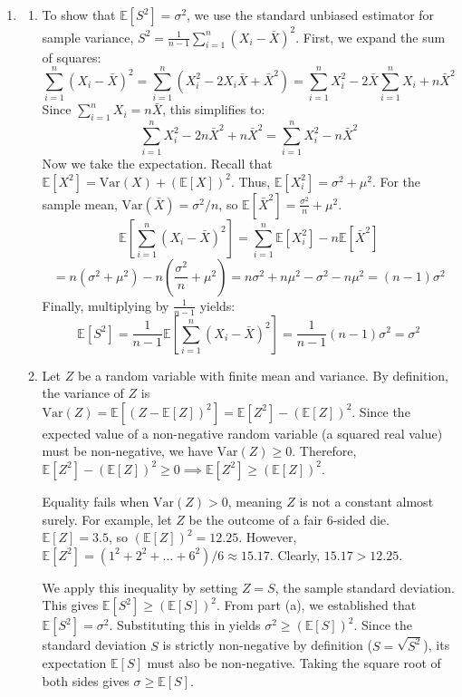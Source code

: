\documentclass[12pt,a4paper]{article}\usepackage[]{graphicx}\usepackage[]{xcolor}
\begin{document}
\begin{enumerate}[label=\arabic*.]
    \item 
    \begin{enumerate}[label=(\alph*)]
        \item To show that $\mathbb{E}[S^2] = \sigma^2$, we use the standard unbiased estimator for sample variance, $S^2 = \frac{1}{n-1}\sum_{i=1}^n(X_i-\bar{X})^2$.
        First, we expand the sum of squares:
        $$ \sum_{i=1}^n (X_i - \bar{X})^2 = \sum_{i=1}^n (X_i^2 - 2X_i\bar{X} + \bar{X}^2) = \sum_{i=1}^n X_i^2 - 2\bar{X}\sum_{i=1}^n X_i + n\bar{X}^2 $$
        Since $\sum_{i=1}^n X_i = n\bar{X}$, this simplifies to:
        $$ \sum_{i=1}^n X_i^2 - 2n\bar{X}^2 + n\bar{X}^2 = \sum_{i=1}^n X_i^2 - n\bar{X}^2 $$
        Now we take the expectation. Recall that $\mathbb{E}[X^2] = \text{Var}(X) + (\mathbb{E}[X])^2$. Thus, $\mathbb{E}[X_i^2] = \sigma^2 + \mu^2$. 
        For the sample mean, $\text{Var}(\bar{X}) = \sigma^2/n$, so $\mathbb{E}[\bar{X}^2] = \frac{\sigma^2}{n} + \mu^2$.
        $$ \mathbb{E}\left[\sum_{i=1}^n (X_i - \bar{X})^2\right] = \sum_{i=1}^n \mathbb{E}[X_i^2] - n\mathbb{E}[\bar{X}^2] $$
        $$ = n(\sigma^2 + \mu^2) - n\left(\frac{\sigma^2}{n} + \mu^2\right) = n\sigma^2 + n\mu^2 - \sigma^2 - n\mu^2 = (n-1)\sigma^2 $$
        Finally, multiplying by $\frac{1}{n-1}$ yields:
        $$ \mathbb{E}[S^2] = \frac{1}{n-1} \mathbb{E}\left[\sum_{i=1}^n (X_i - \bar{X})^2\right] = \frac{1}{n-1}(n-1)\sigma^2 = \sigma^2 $$

        \item Let $Z$ be a random variable with finite mean and variance. By definition, the variance of $Z$ is $\text{Var}(Z) = \mathbb{E}\left[(Z - \mathbb{E}[Z])^2\right] = \mathbb{E}[Z^2] - (\mathbb{E}[Z])^2$.
        Since the expected value of a non-negative random variable (a squared real value) must be non-negative, we have $\text{Var}(Z) \geq 0$.
        Therefore, $\mathbb{E}[Z^2] - (\mathbb{E}[Z])^2 \geq 0 \implies \mathbb{E}[Z^2] \geq (\mathbb{E}[Z])^2$.
        
        Equality fails when $\text{Var}(Z) > 0$, meaning $Z$ is not a constant almost surely. For example, let $Z$ be the outcome of a fair 6-sided die. $\mathbb{E}[Z] = 3.5$, so $(\mathbb{E}[Z])^2 = 12.25$. However, $\mathbb{E}[Z^2] = (1^2 + 2^2 + \dots + 6^2)/6 \approx 15.17$. Clearly, $15.17 > 12.25$.
        
        We apply this inequality by setting $Z = S$, the sample standard deviation. This gives $\mathbb{E}[S^2] \geq (\mathbb{E}[S])^2$.
        From part (a), we established that $\mathbb{E}[S^2] = \sigma^2$. Substituting this in yields $\sigma^2 \geq (\mathbb{E}[S])^2$.
        Since the standard deviation $S$ is strictly non-negative by definition ($S = \sqrt{S^2}$), its expectation $\mathbb{E}[S]$ must also be non-negative. Taking the square root of both sides gives $\sigma \geq \mathbb{E}[S]$.
        

\end{enumerate}
\end{enumerate}
\end{document}
